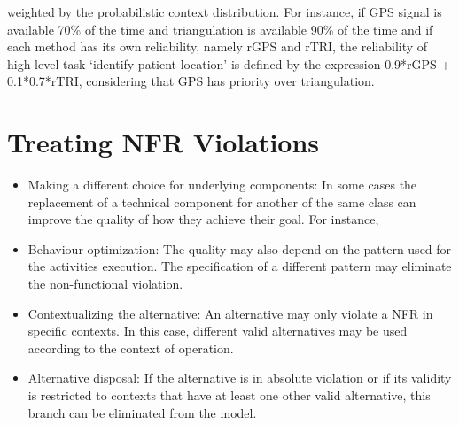 weighted by the probabilistic context distribution. For instance, if GPS signal is available 70\% of the time and triangulation is available 90\% of the time and if each method has its own reliability, namely rGPS and rTRI, the reliability of high-level task `identify patient location' is defined by the expression 0.9*rGPS + 0.1*0.7*rTRI, considering that GPS has priority over triangulation. 

\section{Treating NFR Violations}

\begin{itemize}

\item Making a different choice for underlying components: In some cases the replacement of a technical component for another of the same class can improve the quality of how they achieve their goal. For instance,
\medskip

\item Behaviour optimization: The quality may also depend on the pattern used for the activities execution. The specification of a different pattern may eliminate the non-functional violation. 
\medskip

\item Contextualizing the alternative: An alternative may only violate a NFR in specific contexts. In this case, different valid alternatives may be used according to the context of operation.
\medskip

\item Alternative disposal: If the alternative is in absolute violation or if its validity is restricted to contexts that have at least one other valid alternative, this branch can be eliminated from the model.

\end{itemize}





